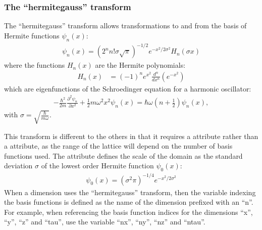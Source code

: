 \documentclass[letterpaper,10pt,english]{sphinxmanual}
\begin{document}
\ignorespaces 

\subsubsection{The “hermite\sphinxhyphen{}gauss” transform}
\label{\detokenize{reference_elements:the-hermite-gauss-transform}}\label{\detokenize{reference_elements:hermite-gauss-transform}}\label{\detokenize{reference_elements:index-42}}
\sphinxAtStartPar
The “hermite\sphinxhyphen{}gauss” transform allows transformations to and from the basis of Hermite functions \(\psi_n(x)\):
\begin{equation*}
\begin{split}\psi_n(x) = \left(2^n n! \sigma \sqrt{\pi}\right)^{-1/2} e^{-x^2/2\sigma^2} H_n(\sigma x)\end{split}
\end{equation*}
\sphinxAtStartPar
where the functions \(H_n(x)\) are the Hermite polynomials:
\begin{equation*}
\begin{split}H_n(x) &= (-1)^n e^{x^2} \frac{d^n}{dx^n} \left(e^{-x^2}\right)\end{split}
\end{equation*}
\sphinxAtStartPar
which are eigenfunctions of the Schroedinger equation for a harmonic oscillator:
\begin{equation*}
\begin{split}- \frac{\hbar^2}{2 m} \frac{\partial^2 \psi_n}{\partial x^2} + \frac{1}{2} m \omega^2 x^2 \psi_n(x) = \hbar \omega\left(n+\frac{1}{2}\right) \psi_n(x),\end{split}
\end{equation*}
\sphinxAtStartPar
with \(\sigma = \sqrt{\frac{\hbar}{m \omega}}\).

\ignorespaces 
\sphinxAtStartPar
This transform is different to the others in that it requires a  attribute rather than a  attribute, as the range of the lattice will depend on the number of basis functions used. The  attribute defines the scale of the domain as the standard deviation \(\sigma\) of the lowest order Hermite function \(\psi_0(x)\):
\begin{equation*}
\begin{split}\psi_0(x) = (\sigma^2 \pi)^{-1/4} e^{-x^2/2 \sigma^2}\end{split}
\end{equation*}
\sphinxAtStartPar
When a dimension uses the “hermite\sphinxhyphen{}gauss” transform, then the variable indexing the basis functions is defined as the name of the dimension prefixed with an “n”.  For example, when referencing the basis function indices for the dimensions “x”, “y”, “z” and “tau”, use the variable “nx”, “ny”, “nz” and “ntau”.
\end{document}
